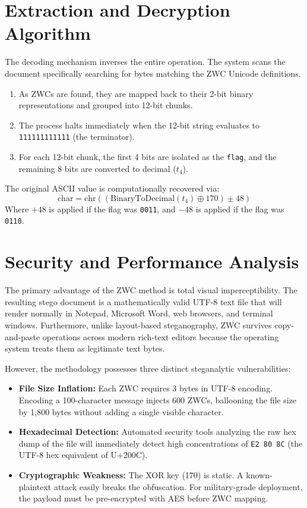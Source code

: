\documentclass[12pt,a4paper]{report}
\begin{document}
\section{Extraction and Decryption Algorithm}
The decoding mechanism inverses the entire operation. The system scans the document specifically searching for bytes matching the ZWC Unicode definitions. 
\begin{enumerate}
    \item As ZWCs are found, they are mapped back to their 2-bit binary representations and grouped into 12-bit chunks.
    \item The process halts immediately when the 12-bit string evaluates to \texttt{111111111111} (the terminator).
    \item For each 12-bit chunk, the first 4 bits are isolated as the \texttt{flag}, and the remaining 8 bits are converted to decimal ($t_4$).
\end{enumerate}

The original ASCII value is computationally recovered via:
\begin{equation}
    \text{char} = \text{chr}\left((\text{BinaryToDecimal}(t_4) \oplus 170) \pm 48\right)
\end{equation}
Where $+48$ is applied if the flag was \texttt{0011}, and $-48$ is applied if the flag was \texttt{0110}.

\section{Security and Performance Analysis}
The primary advantage of the ZWC method is total visual imperceptibility. The resulting stego document is a mathematically valid UTF-8 text file that will render normally in Notepad, Microsoft Word, web browsers, and terminal windows. Furthermore, unlike layout-based steganography, ZWC survives copy-and-paste operations across modern rich-text editors because the operating system treats them as legitimate text bytes.

However, the methodology possesses three distinct steganalytic vulnerabilities:
\begin{itemize}
    \item \textbf{File Size Inflation:} Each ZWC requires 3 bytes in UTF-8 encoding. Encoding a 100-character message injects 600 ZWCs, ballooning the file size by 1,800 bytes without adding a single visible character.
    \item \textbf{Hexadecimal Detection:} Automated security tools analyzing the raw hex dump of the file will immediately detect high concentrations of \texttt{E2 80 8C} (the UTF-8 hex equivalent of U+200C).
    \item \textbf{Cryptographic Weakness:} The XOR key (170) is static. A known-plaintext attack easily breaks the obfuscation. For military-grade deployment, the payload must be pre-encrypted with AES before ZWC mapping.
\end{itemize}
\end{document}
